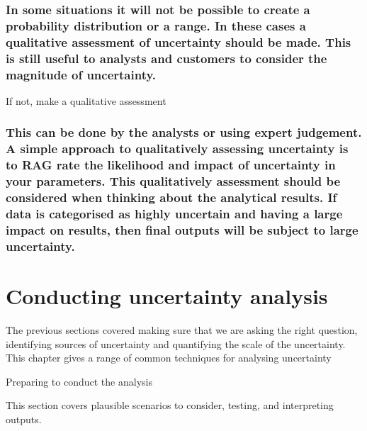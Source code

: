 \documentclass[]{book}
\begin{document}
\subsection{In some situations it will not be possible to create a
probability distribution or a range. In these cases a qualitative
assessment of uncertainty should be made. This is still useful to
analysts and customers to consider the magnitude of
uncertainty.}\label{in-some-situations-it-will-not-be-possible-to-create-a-probability-distribution-or-a-range.-in-these-cases-a-qualitative-assessment-of-uncertainty-should-be-made.-this-is-still-useful-to-analysts-and-customers-to-consider-the-magnitude-of-uncertainty.}

 If not, make a qualitative assessment

\subsection{This can be done by the analysts or using expert judgement.
A simple approach to qualitatively assessing uncertainty is to RAG rate
the likelihood and impact of uncertainty in your parameters. This
qualitatively assessment should be considered when thinking about the
analytical results. If data is categorised as highly uncertain and
having a large impact on results, then final outputs will be subject to
large
uncertainty.}\label{this-can-be-done-by-the-analysts-or-using-expert-judgement.-a-simple-approach-to-qualitatively-assessing-uncertainty-is-to-rag-rate-the-likelihood-and-impact-of-uncertainty-in-your-parameters.-this-qualitatively-assessment-should-be-considered-when-thinking-about-the-analytical-results.-if-data-is-categorised-as-highly-uncertain-and-having-a-large-impact-on-results-then-final-outputs-will-be-subject-to-large-uncertainty.}

\chapter{Conducting uncertainty
analysis}\label{conducting-uncertainty-analysis}

 The previous sections covered making sure that we are asking the right
question, identifying sources of uncertainty and quantifying the scale
of the uncertainty. This chapter gives a range of common techniques for
analysing uncertainty

Preparing to conduct the analysis

 This section covers plausible scenarios to consider, testing, and
interpreting outputs.
\end{document}
